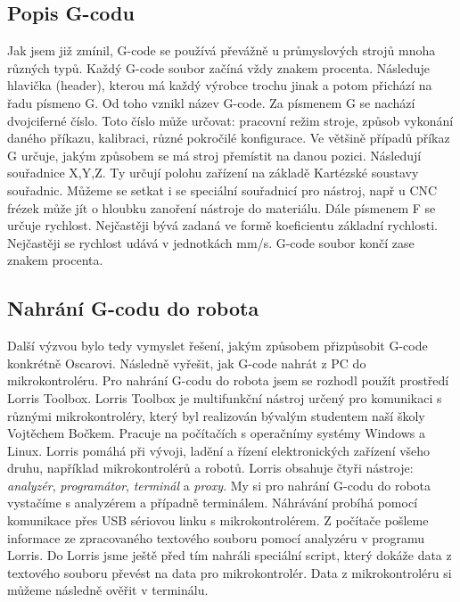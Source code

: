     \subsection{Popis G-codu}
     Jak jsem již zmínil, G-code se používá převážně u průmyslových strojů mnoha různých typů. Každý G-code soubor začíná vždy znakem procenta. Následuje hlavička (header), kterou má každý výrobce trochu jinak a potom přichází na řadu písmeno G. Od toho vznikl název G-code. Za písmenem G se nachází dvojciferné číslo. Toto číslo může určovat: pracovní režim stroje, způsob vykonání daného příkazu, kalibraci, různé pokročilé konfigurace. Ve většině případů příkaz G určuje, jakým způsobem se má stroj přemístit na danou pozici. Následují souřadnice X,Y,Z. Ty určují polohu zařízení na základě Kartézské soustavy souřadnic. Můžeme se setkat i se speciální souřadnicí pro nástroj, např u CNC frézek může jít o hloubku zanoření nástroje do materiálu. Dále písmenem F se určuje rychlost. Nejčastěji bývá zadaná ve formě koeficientu základní rychlosti. Nejčastěji se rychlost udává v jednotkách mm/s. G-code soubor končí zase znakem procenta. \cite{G-kód} \cite{G-code-wiki} 
    
    \subsection{Nahrání G-codu do robota}
   Další výzvou bylo tedy vymyslet řešení, jakým způsobem přizpůsobit G-code konkrétně Oscarovi. Následně vyřešit, jak G-code nahrát z PC do mikrokontroléru. Pro nahrání G-codu do robota jsem se rozhodl použít prostředí Lorris Toolbox. Lorris Toolbox je multifunkční nástroj určený pro komunikaci s různými mikrokontroléry, který byl realizován bývalým studentem naší školy Vojtěchem Bočkem. Pracuje na počítačích s operačnímy systémy Windows a Linux. Lorris pomáhá při vývoji, ladění a řízení elektronických zařízení všeho druhu, například mikrokontrolérů a  robotů.
    Lorris obsahuje čtyři nástroje: \textit{analyzér}, \textit{programátor}, \textit{terminál} a \textit{proxy}. My si pro nahrání G-codu do robota vystačíme s analyzérem a případně terminálem. Náhrávání probíhá pomocí komunikace přes USB sériovou linku s mikrokontrolérem. Z počítače pošleme informace ze zpracovaného textového souboru pomocí analyzéru v programu Lorris. Do Lorris jsme ještě před tím nahráli speciální script, který dokáže data z textového souboru převést na data pro mikrokontrolér. Data z mikrokontroléru si můžeme následně ověřit v terminálu. \cite{bibtex:Lorris}


